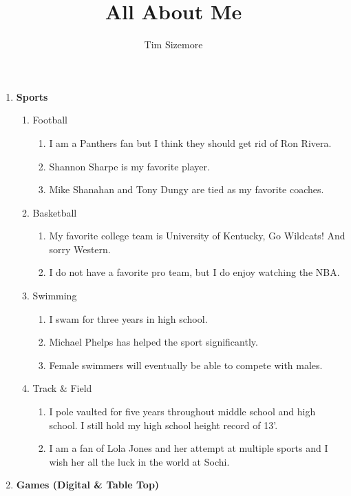 \documentclass{article}
\begin{document}
\title{All About Me}
\author{Tim Sizemore}

\maketitle

\begin{enumerate}
\item \textbf{Sports}
    \begin{enumerate}
    \item Football
        \begin{enumerate}
        \item I am a Panthers fan but I think they should get rid of Ron Rivera.
        \item Shannon Sharpe is my favorite player.
        \item Mike Shanahan and Tony Dungy are tied as my favorite coaches.
        \end{enumerate}
    \item Basketball
        \begin{enumerate}
        \item My favorite college team is University of Kentucky, Go Wildcats!
              And sorry Western.
        \item I do not have a favorite pro team, but I do enjoy watching the NBA.
        \end{enumerate}
    \item Swimming
        \begin{enumerate}
        \item I swam for three years in high school.
        \item Michael Phelps has helped the sport significantly.
        \item Female swimmers will eventually be able to compete with males.
        \end{enumerate}
    \item Track \& Field
        \begin{enumerate}
        \item I pole vaulted for five years throughout middle school and high
              school. I still hold my high school height record of 13'.
        \item I am a fan of Lola Jones and her attempt at multiple sports and
              I wish her all the luck in the world at Sochi.
        \end{enumerate}
    \end{enumerate}
\item \textbf{Games (Digital \& Table Top)}

\end{enumerate}
\end{document}
